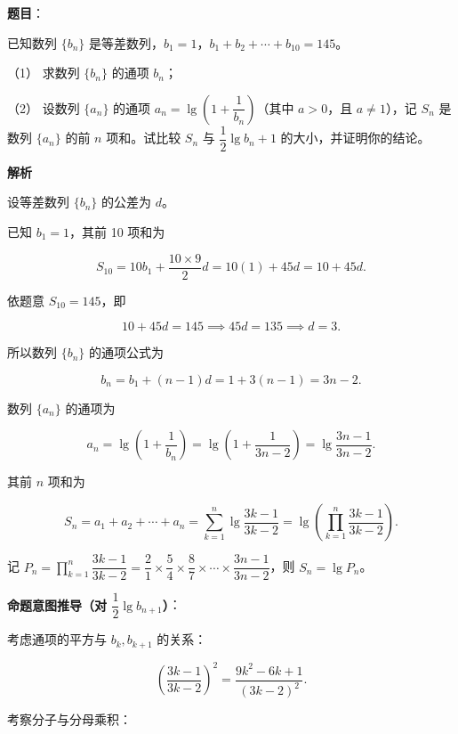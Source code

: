 \begin{answer}

\textbf{题目}：

已知数列 $\{b_n\}$ 是等差数列，$b_1=1$，$b_1+b_2+\cdots+b_{10}=145$。

（1） 求数列 $\{b_n\}$ 的通项 $b_n$；

（2） 设数列 $\{a_n\}$ 的通项 $a_n=\lg\left(1+\dfrac{1}{b_n}\right)$（其中 $a>0$，且 $a\ne 1$），记 $S_n$ 是数列 $\{a_n\}$ 的前 $n$ 项和。试比较 $S_n$ 与 $\dfrac12\lg b_n + 1$ 的大小，并证明你的结论。

\textbf{解析}


设等差数列 $\{b_n\}$ 的公差为 $d$。

已知 $b_1 = 1$，其前 10 项和为

\nopagebreak[4]
\[
S_{10} = 10b_1 + \frac{10 \times 9}{2} d = 10(1) + 45d = 10 + 45d.
\]

依题意 $S_{10} = 145$，即

\nopagebreak[4]
\[
10 + 45d = 145 \implies 45d = 135 \implies d = 3.
\]

所以数列 $\{b_n\}$ 的通项公式为

\nopagebreak[4]
\[
b_n = b_1 + (n-1)d = 1 + 3(n-1) = 3n - 2.
\]


数列 $\{a_n\}$ 的通项为

\nopagebreak[4]
\[
a_n = \lg\left(1 + \frac{1}{b_n}\right) = \lg\left(1 + \frac{1}{3n-2}\right) = \lg\frac{3n-1}{3n-2}.
\]

其前 $n$ 项和为

\nopagebreak[4]
\[
S_n = a_1 + a_2 + \cdots + a_n = \sum_{k=1}^n \lg\frac{3k-1}{3k-2} = \lg\left(\prod_{k=1}^n \frac{3k-1}{3k-2}\right).
\]

记 $P_n = \prod\limits_{k=1}^n \dfrac{3k-1}{3k-2} = \dfrac{2}{1} \times \dfrac{5}{4} \times \dfrac{8}{7} \times \cdots \times \dfrac{3n-1}{3n-2}$，则 $S_n = \lg P_n$。

\textbf{命题意图推导（对 $\dfrac12\lg b_{n+1}$）}：

考虑通项的平方与 $b_k, b_{k+1}$ 的关系：

\nopagebreak[4]
\[
\left(\frac{3k-1}{3k-2}\right)^2 = \frac{9k^2 - 6k + 1}{(3k-2)^2}.
\]

考察分子与分母乘积：


\end{answer}
